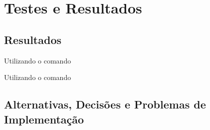 \section{Testes e Resultados}
\label{sec:ts:c}


\subsection{Resultados}

Utilizando o comando 


Utilizando o comando 

\subsection{Alternativas, Decisões e Problemas de Implementação}



